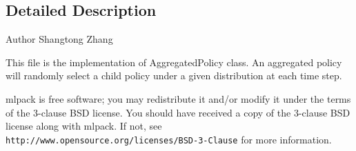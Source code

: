 \subsection{Detailed Description}
\begin{DoxyAuthor}{Author}
Shangtong Zhang
\end{DoxyAuthor}
This file is the implementation of Aggregated\+Policy class. An aggregated policy will randomly select a child policy under a given distribution at each time step.

mlpack is free software; you may redistribute it and/or modify it under the terms of the 3-\/clause B\+SD license. You should have received a copy of the 3-\/clause B\+SD license along with mlpack. If not, see {\tt http\+://www.\+opensource.\+org/licenses/\+B\+S\+D-\/3-\/\+Clause} for more information. 